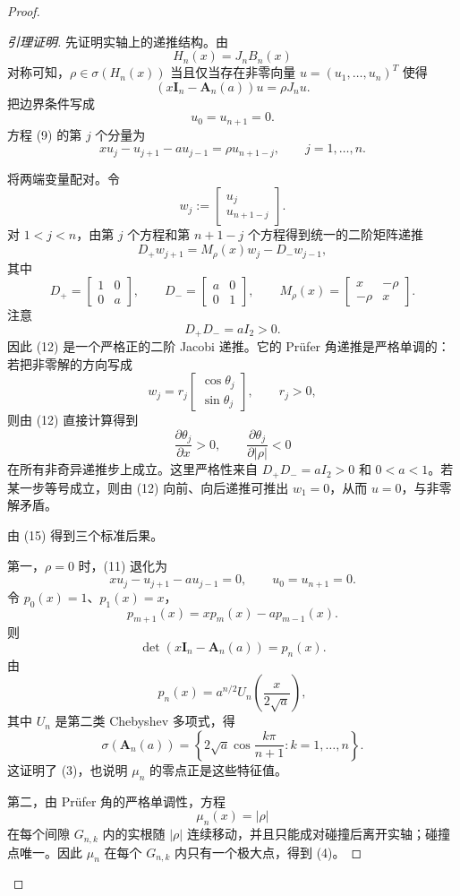 \documentclass[11pt]{ctexart}
\newcommand{\A}{\mathbf A}
\newcommand{\I}{\mathbf I}
\begin{document}
\begin{proof}
\begin{proof}[引理证明]
先证明实轴上的递推结构。由
\[
H_n(x)=J_nB_n(x)
\]
对称可知，\(\rho\in\sigma(H_n(x))\) 当且仅当存在非零向量 \(u=(u_1,\dots,u_n)^T\) 使得
\[
(x\I_n-\A_n(a))u=\rho J_nu.
\tag{9}
\]
把边界条件写成
\[
u_0=u_{n+1}=0.
\tag{10}
\]
方程 (9) 的第 \(j\) 个分量为
\[
xu_j-u_{j+1}-a u_{j-1}=\rho u_{n+1-j},
\qquad j=1,\dots,n.
\tag{11}
\]

将两端变量配对。令
\[
w_j:=
\begin{bmatrix}
u_j\\
u_{n+1-j}
\end{bmatrix}.
\]
对 \(1<j<n\)，由第 \(j\) 个方程和第 \(n+1-j\) 个方程得到统一的二阶矩阵递推
\[
D_+w_{j+1}
=
M_\rho(x)w_j-D_-w_{j-1},
\tag{12}
\]
其中
\[
D_+=
\begin{bmatrix}
1&0\\
0&a
\end{bmatrix},
\qquad
D_-=
\begin{bmatrix}
a&0\\
0&1
\end{bmatrix},
\qquad
M_\rho(x)=
\begin{bmatrix}
x&-\rho\\
-\rho&x
\end{bmatrix}.
\tag{13}
\]
注意
\[
D_+D_-=aI_2>0.
\tag{14}
\]
因此 (12) 是一个严格正的二阶 Jacobi 递推。它的 Prüfer 角递推是严格单调的：若把非零解的方向写成
\[
w_j=r_j
\begin{bmatrix}
\cos\theta_j\\
\sin\theta_j
\end{bmatrix},
\qquad r_j>0,
\]
则由 (12) 直接计算得到
\[
\frac{\partial\theta_j}{\partial x}>0,
\qquad
\frac{\partial\theta_j}{\partial |\rho|}<0
\tag{15}
\]
在所有非奇异递推步上成立。这里严格性来自 \(D_+D_-=aI_2>0\) 和 \(0<a<1\)。若某一步等号成立，则由 (12) 向前、向后递推可推出 \(w_1=0\)，从而 \(u=0\)，与非零解矛盾。

由 (15) 得到三个标准后果。

第一，\(\rho=0\) 时，(11) 退化为
\[
xu_j-u_{j+1}-a u_{j-1}=0,
\qquad u_0=u_{n+1}=0.
\tag{16}
\]
令 \(p_0(x)=1\)、\(p_1(x)=x\)，
\[
p_{m+1}(x)=xp_m(x)-a p_{m-1}(x).
\tag{17}
\]
则
\[
\det(x\I_n-\A_n(a))=p_n(x).
\tag{18}
\]
由
\[
p_n(x)=a^{n/2}U_n\!\left(\frac{x}{2\sqrt a}\right),
\tag{19}
\]
其中 \(U_n\) 是第二类 Chebyshev 多项式，得
\[
\sigma(\A_n(a))
=
\left\{
2\sqrt a\cos\frac{k\pi}{n+1}:k=1,\dots,n
\right\}.
\tag{20}
\]
这证明了 (3)，也说明 \(\mu_n\) 的零点正是这些特征值。

第二，由 Prüfer 角的严格单调性，方程
\[
\mu_n(x)=|\rho|
\tag{21}
\]
在每个间隙 \(G_{n,k}\) 内的实根随 \(|\rho|\) 连续移动，并且只能成对碰撞后离开实轴；碰撞点唯一。因此 \(\mu_n\) 在每个 \(G_{n,k}\) 内只有一个极大点，得到 (4)。


\end{proof}
\end{proof}
\end{document}

